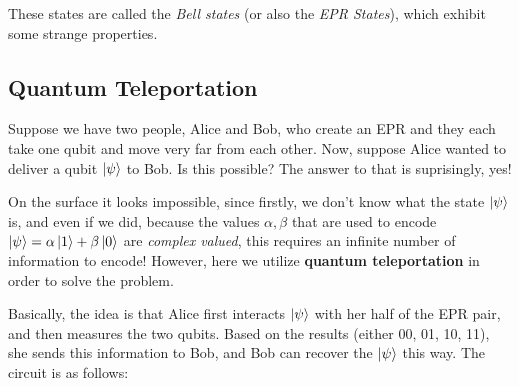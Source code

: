 
These states are called the \textit{Bell states} (or also the \textit{EPR States}), which exhibit some strange 
properties. 

\subsection{Quantum Teleportation}
Suppose we have two people, Alice and Bob, who create an EPR and they each take one qubit and move very far from each 
other. Now, suppose Alice wanted to deliver a qubit  \( \ket{\psi} \) to Bob. Is this possible? The answer to that is suprisingly, 
yes! 

On the surface it looks impossible, since firstly, we don't know what the state \( \ket{\psi} \) is, and even if we did, 
because the values \( \alpha, \beta \) that are used to encode \( \ket{\psi} = \alpha \ket{1} + \beta \ket{0} \) are \textit{complex
valued}, this requires an infinite number of information to encode! However, here we utilize \textbf{quantum teleportation} 
in order to solve the problem. 

Basically, the idea is that Alice first interacts \( \ket{\psi} \) with her half of the EPR pair, and then measures the 
two qubits. Based on the results (either 00, 01, 10, 11), she sends this information to Bob, 
and Bob can recover the \( \ket{\psi} \) this way. The circuit is as follows: 

